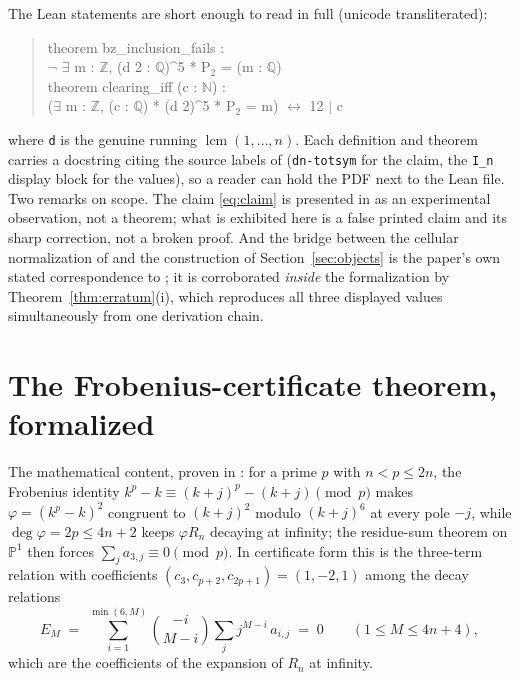 \documentclass[11pt]{article}
\theoremstyle{definition}
\DeclareMathOperator{\lcm}{lcm}
\newcommand{\Z}{\mathbb{Z}}
\newcommand{\Q}{\mathbb{Q}}
\newcommand{\bin}[2]{\binom{#1}{#2}}
\newcommand{\lean}[1]{\texttt{#1}}
\begin{document}
The Lean statements are short enough to read in full (unicode transliterated):

\begin{quote}\small\ttfamily
theorem bz\_inclusion\_fails :\\
\hspace*{1em}$\lnot$ $\exists$ m : $\Z$, (d 2 : $\Q$)\^{}5 * P$_2$ = (m : $\Q$)\\[2pt]
theorem clearing\_iff (c : $\mathbb{N}$) :\\
\hspace*{1em}($\exists$ m : $\Z$, (c : $\Q$) * (d 2)\^{}5 * P$_2$ = m) $\leftrightarrow$ 12 $\mid$ c
\end{quote}

\noindent
where \lean{d} is the genuine running $\lcm(1,\dots,n)$. Each definition and
theorem carries a docstring citing the source labels of \cite{BZ22}
(\lean{dn-totsym} for the claim, the \lean{I\_n} display block for the
values), so a reader can hold the PDF next to the Lean file. Two remarks on
scope. The claim \eqref{eq:claim} is presented in \cite{BZ22} as an
experimental observation, not a theorem; what is exhibited here is a false
printed claim and its sharp correction, not a broken proof. And the bridge
between the cellular normalization of \cite{BZ22} and the construction of
Section~\ref{sec:objects} is the paper's own stated correspondence to
\cite{Zu02}; it is corroborated \emph{inside} the formalization by
Theorem~\ref{thm:erratum}(i), which reproduces all three displayed values
simultaneously from one derivation chain.

\section{The Frobenius-certificate theorem, formalized}\label{sec:cert}

The mathematical content, proven in \cite{CBcert}: for a prime $p$ with
$n < p \le 2n$, the Frobenius identity $k^p - k \equiv (k+j)^p - (k+j)
\pmod p$ makes $\varphi = (k^p - k)^2$ congruent to $(k+j)^2$ modulo
$(k+j)^6$ at every pole $-j$, while $\deg \varphi = 2p \le 4n + 2$ keeps
$\varphi R_n$ decaying at infinity; the residue-sum theorem on $\mathbb P^1$
then forces $\sum_j a_{3,j} \equiv 0 \pmod p$. In certificate form this is
the three-term relation with coefficients $(c_3, c_{p+2}, c_{2p+1}) =
(1, -2, 1)$ among the decay relations
\[
E_M \;=\; \sum_{i=1}^{\min(6,M)} \bin{-i}{M-i} \sum_{j} j^{M-i}\, a_{i,j}
\;=\; 0 \qquad (1 \le M \le 4n+4),
\]
which are the coefficients of the expansion of $R_n$ at infinity.
\end{document}
